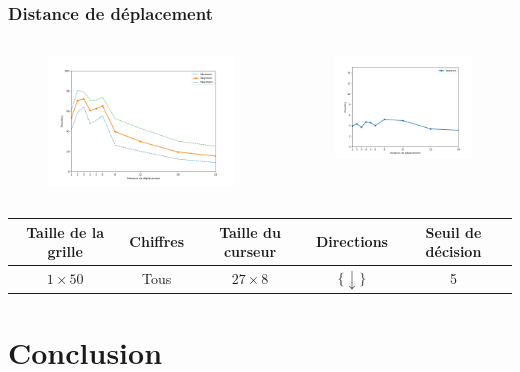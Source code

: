 \documentclass{beamer}
\begin{document}
\begin{frame}
    \frametitle{Distance de déplacement}
    \begin{columns}[c]
        \begin{column}{.5\textwidth}
            \begin{figure}
                \includegraphics[height=0.5\textheight]{movedist_acc_mean.png}
            \end{figure}
        \end{column}
        \begin{column}{.5\textwidth}
            \begin{figure}
                \includegraphics[height=0.45\textheight]{movedist_acc_std.png}
            \end{figure}
        \end{column}
    \end{columns}
    \center
    \fontsize{7pt}{7}\selectfont
    \begin{tabu}{|c|c|c|c|c|}\hline
        Taille de la grille & Chiffres & Taille du curseur & Directions & Seuil de décision \\ \hline
        $1 \times 50$ & Tous & $27 \times 8$ & $\{\downarrow\}$ & 5 \\ \hline
    \end{tabu}
    \vspace{6em}
\end{frame}

\section{Conclusion}
\end{document}

